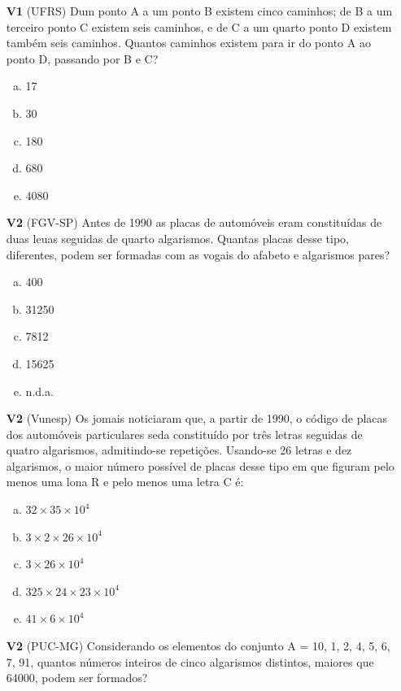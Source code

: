 \documentclass[a4paper,12pt]{article}
\begin{document}
\begin{enumerate}

\item[\textbf{V1}]  (UFRS) Dum ponto A a um ponto B existem cinco caminhos; de B a um terceiro ponto C existem seis caminhos, e de C a um quarto ponto D existem também seis caminhos. Quantos caminhos existem para ir do ponto A ao ponto D, passando por B e C?
  \begin{enumerate}[a)]
    \item 17
    \item 30
    \item 180
    \item 680
    \item 4080
  \end{enumerate}  
 
\item[\textbf{V2}] (FGV-SP) Antes de 1990 as placas de automóveis eram constituídas de duas leuas seguidas de quarto algarismos. Quantas placas desse tipo, diferentes, podem ser formadas com as vogais do afabeto e algarismos pares?
  \begin{enumerate}[a)]
    \item 400
    \item 31250
    \item 7812
    \item 15625
    \item n.d.a. 
  \end{enumerate} 
 
\item[\textbf{V2}] (Vunesp) Os jomais noticiaram que, a partir de 1990, o código de placas dos automóveis particulares seda constituído por três letras seguidas de quatro algarismos, admitindo-se repetições. Usando-se 26 letras e dez algarismos, o maior número possível de placas desse tipo em que figuram pelo menos uma lona R e pelo menos uma letra C é:

  \begin{enumerate}[a)]
    \item $32 \times 35 \times 10^4$
    \item $3 \times 2 \times 26 \times 10^4$
    \item $3 \times 26 \times 10^4$
    \item $325 \times  24 \times 23 \times 10^4 $
    \item $41 \times 6 \times 10^4 $
  \end{enumerate} 

\item[\textbf{V2}]  (PUC-MG) Considerando os elementos do conjunto A = 10, 1, 2, 4, 5, 6, 7, 91, quantos números inteiros de cinco algarismos distintos, maiores que 64000, podem ser formados? 


\end{enumerate}
\end{document}

